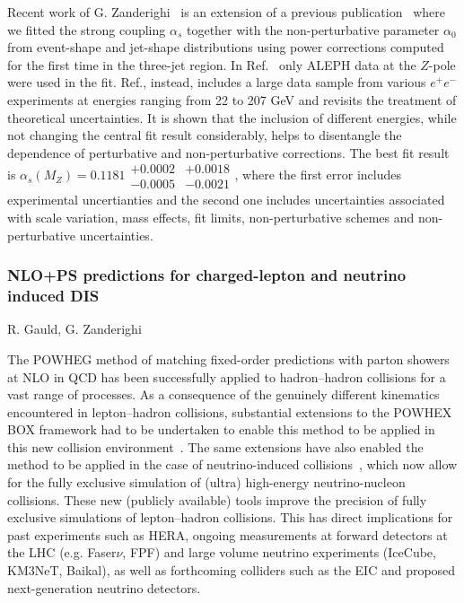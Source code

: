 \documentclass{FBR_Bericht_2025}
\begin{document}
\begin{refsection}
%
Recent work of G. Zanderighi~\cite{Nason:2025qbx} is an extension of a previous
publication~\cite{Nason:2023asn} where we fitted the strong coupling
$\alpha_s$ together with the non-perturbative parameter $\alpha_0$ from
event-shape and jet-shape distributions using power corrections
computed for the first time in the three-jet region.
%
In Ref.~\cite{Nason:2023asn} only ALEPH data at the $Z$-pole were
used in the fit. Ref.\cite{Nason:2025qbx}, instead, includes a large data sample from
various $e^+e^-$ experiments at energies ranging from 22 to 207
GeV and revisits the treatment of theoretical uncertainties.
%
It is shown that the inclusion of different energies, while not
changing the central fit result considerably, helps to disentangle the
dependence of perturbative and non-perturbative corrections.
%
The best fit result is $\alpha_s(M_Z) = 0.1181 \substack{ +0.0002
  \\ -0.0005} \substack{ +0.0018 \\ -0.0021}$, where the first error
includes experimental uncertianties and the second one includes
uncertainties associated with scale variation, mass effects, fit
limits, non-perturbative schemes and non-perturbative uncertainties.

\subsubsection{NLO+PS predictions for charged-lepton and neutrino induced DIS}
\begin{Namen}
R. Gauld, G. Zanderighi
\end{Namen}
The POWHEG method of matching fixed-order predictions with parton showers at NLO in QCD has been successfully applied to hadron--hadron collisions for a vast range of processes. As a consequence of the genuinely different kinematics encountered in lepton--hadron collisions, substantial extensions to the POWHEX BOX framework had to be undertaken to enable this method to be applied in this new collision environment~\cite{Banfi:2023mhz}.
The same extensions have also enabled the method to be applied in the case of neutrino-induced collisions~\cite{FerrarioRavasio:2024kem}, which now allow for the fully exclusive simulation of (ultra) high-energy neutrino-nucleon collisions.
These new (publicly available) tools improve the precision of fully exclusive simulations of lepton--hadron collisions. This has direct implications for past experiments such as HERA, ongoing measurements at forward detectors at the LHC (e.g. Faser$\nu$, FPF) and large volume neutrino experiments (IceCube, KM3NeT, Baikal), as well as forthcoming colliders such as the EIC and proposed next-generation neutrino detectors.
%



\end{refsection}
\end{document}

